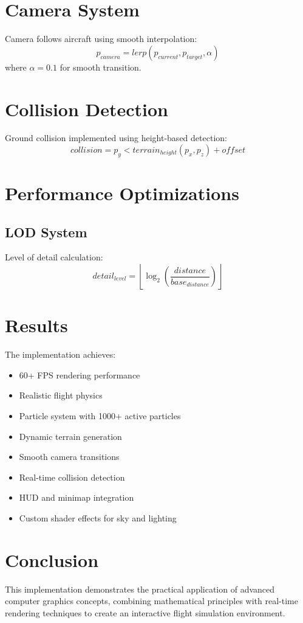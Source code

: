 \documentclass{article}
\begin{document}
\section{Camera System}
Camera follows aircraft using smooth interpolation:
\begin{equation}
p_{camera} = lerp(p_{current}, p_{target}, \alpha)
\end{equation}
where $\alpha = 0.1$ for smooth transition.

\section{Collision Detection}
Ground collision implemented using height-based detection:
\begin{equation}
collision = p_y < terrain_{height}(p_x, p_z) + offset
\end{equation}

\section{Performance Optimizations}

\subsection{LOD System}
Level of detail calculation:
\begin{equation}
detail_{level} = \left\lfloor\log_2\left(\frac{distance}{base_{distance}}\right)\right\rfloor
\end{equation}

\section{Results}
The implementation achieves:
\begin{itemize}
\item 60+ FPS rendering performance
\item Realistic flight physics
\item Particle system with 1000+ active particles
\item Dynamic terrain generation
\item Smooth camera transitions
\item Real-time collision detection
\item HUD and minimap integration
\item Custom shader effects for sky and lighting
\end{itemize}

\section{Conclusion}
This implementation demonstrates the practical application of advanced computer graphics concepts, combining mathematical principles with real-time rendering techniques to create an interactive flight simulation environment.
\end{document}
